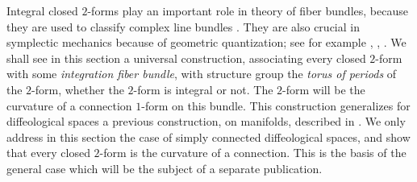 \begin{sechead}
  Integral closed $2$-forms play an important role in theory of fiber bundles,
  because they are used to classify complex line bundles \cite{Mil74}.
  They are also crucial in symplectic mechanics because of geometric quantization;
  see for example \cite{Sou70}, \cite{Bry93}, \cite{BatWei97}.
  We shall see in this section a universal construction,
  associating every closed $2$-form with some {\em integration fiber bundle},
  with structure group the {\em torus of periods} of the $2$-form,
  whether the $2$-form is integral or not.
  The $2$-form will be the curvature of a connection $1$-form on this bundle.
  This construction generalizes for diffeological spaces a previous construction,
  on manifolds, described in \cite{Igl95}.
  We only address in this section the case of simply connected diffeological spaces,
  and show that every closed $2$-form  is the curvature of a connection.
  This is the basis of the general case which will be the subject of a separate publication.
\end{sechead}

